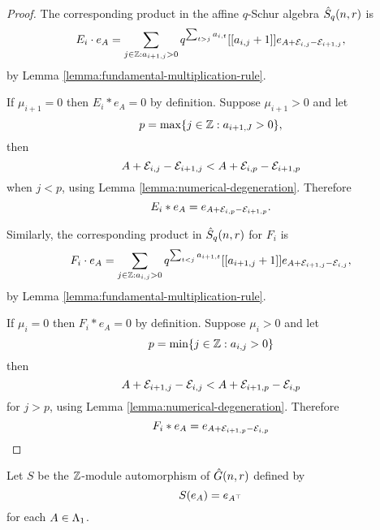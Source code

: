 \documentclass[a4paper, 11pt, twoside]{report}
\begin{document}
\begin{proof}
The corresponding product in the affine $q$-Schur algebra $\hat{S}_q(n,r)$ is
\begin{equation*}
E_i\cdot e_A = \sum_{j\in\mathbb{Z}:a_{i+1,j}>0} q^{\sum_{t>j} a_{i,t}}[[a_{i,j}+1]]e_{A+\mathcal{E}_{i,j}-\mathcal{E}_{i+1,j}},
\end{equation*}
by Lemma \ref{lemma:fundamental-multiplication-rule}.

If $\mu_{i+1}=0$ then $E_i\ast e_A=0$ by definition. Suppose $\mu_{i+1}>0$ and let
\begin{equation*}
p = \max\{j\in\mathbb{Z}: a_{i+1,J}>0\},
\end{equation*}
then
\begin{equation*}
A+\mathcal{E}_{i,j}-\mathcal{E}_{i+1,j} < A+\mathcal{E}_{i,p}-\mathcal{E}_{i+1,p}
\end{equation*}
when $j<p$, using Lemma \ref{lemma:numerical-degeneration}. Therefore
\begin{equation*}
E_i\ast e_A = e_{A+\mathcal{E}_{i,p}-\mathcal{E}_{i+1,p}}.
\end{equation*}

Similarly, the corresponding product in $\hat{S}_q(n,r)$ for $F_i$ is
\begin{equation*}
F_i\cdot e_A = \sum_{j\in\mathbb{Z}:a_{i,j}>0} q^{\sum_{t<j} a_{i+1,t}}[[a_{i+1,j}+1]] e_{A+\mathcal{E}_{i+1,j}-\mathcal{E}_{i,j}},
\end{equation*}
by Lemma \ref{lemma:fundamental-multiplication-rule}.

If $\mu_i=0$ then $F_i\ast e_A = 0$ by definition. Suppose $\mu_i>0$ and let
\begin{equation*}
p = \min\{j\in\mathbb{Z}:a_{i,j}>0\}
\end{equation*}
then
\begin{equation*}
A+\mathcal{E}_{i+1,j}-\mathcal{E}_{i,j} < A+\mathcal{E}_{i+1,p}-\mathcal{E}_{i,p}
\end{equation*}
for $j>p$, using Lemma \ref{lemma:numerical-degeneration}. Therefore
\begin{equation*}
F_i\ast e_A = e_{A+\mathcal{E}_{i+1,p}-\mathcal{E}_{i,p}}
\end{equation*}
\end{proof}

Let $S$ be the $\mathbb{Z}$-module automorphism of $\hat{G}(n,r)$ defined by
\begin{equation*}
S{(e_A)}=e_{A^\top}
\end{equation*}
for each $A\in\Lambda_1{}$.
\end{document}
